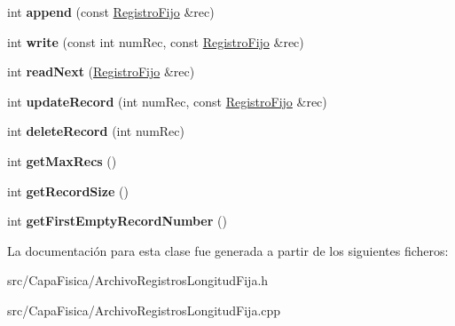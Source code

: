 \begin{DoxyCompactItemize}
\item 
\hypertarget{class_archivo_registros_longitud_fija_a8a9c93d4fe3fdda624726cf0a93c501c}{int {\bfseries append} (const \hyperlink{class_registro_fijo}{\-Registro\-Fijo} \&rec)}\label{class_archivo_registros_longitud_fija_a8a9c93d4fe3fdda624726cf0a93c501c}

\item 
\hypertarget{class_archivo_registros_longitud_fija_ade94a4e3a8a8e5cf94eec0b1a4b0436f}{int {\bfseries write} (const int num\-Rec, const \hyperlink{class_registro_fijo}{\-Registro\-Fijo} \&rec)}\label{class_archivo_registros_longitud_fija_ade94a4e3a8a8e5cf94eec0b1a4b0436f}

\item 
\hypertarget{class_archivo_registros_longitud_fija_afbf155f3500558a13a1e4d96f9e23149}{int {\bfseries read\-Next} (\hyperlink{class_registro_fijo}{\-Registro\-Fijo} \&rec)}\label{class_archivo_registros_longitud_fija_afbf155f3500558a13a1e4d96f9e23149}

\item 
\hypertarget{class_archivo_registros_longitud_fija_a8d3ea3e79b46673e2e79e4b61ffb8500}{int {\bfseries update\-Record} (int num\-Rec, const \hyperlink{class_registro_fijo}{\-Registro\-Fijo} \&rec)}\label{class_archivo_registros_longitud_fija_a8d3ea3e79b46673e2e79e4b61ffb8500}

\item 
\hypertarget{class_archivo_registros_longitud_fija_ac29370395c6cc4e2d5bcf057c938a68a}{int {\bfseries delete\-Record} (int num\-Rec)}\label{class_archivo_registros_longitud_fija_ac29370395c6cc4e2d5bcf057c938a68a}

\item 
\hypertarget{class_archivo_registros_longitud_fija_a3229d67a0b84c2f1e48392f14b823a9e}{int {\bfseries get\-Max\-Recs} ()}\label{class_archivo_registros_longitud_fija_a3229d67a0b84c2f1e48392f14b823a9e}

\item 
\hypertarget{class_archivo_registros_longitud_fija_adadd85ed91267abc7a7da9be19f7aefe}{int {\bfseries get\-Record\-Size} ()}\label{class_archivo_registros_longitud_fija_adadd85ed91267abc7a7da9be19f7aefe}

\item 
\hypertarget{class_archivo_registros_longitud_fija_afcbaae0544e5bf578410c2c501c54bae}{int {\bfseries get\-First\-Empty\-Record\-Number} ()}\label{class_archivo_registros_longitud_fija_afcbaae0544e5bf578410c2c501c54bae}

\end{DoxyCompactItemize}


\-La documentación para esta clase fue generada a partir de los siguientes ficheros\-:\begin{DoxyCompactItemize}
\item 
src/\-Capa\-Fisica/\-Archivo\-Registros\-Longitud\-Fija.\-h\item 
src/\-Capa\-Fisica/\-Archivo\-Registros\-Longitud\-Fija.\-cpp\end{DoxyCompactItemize}
